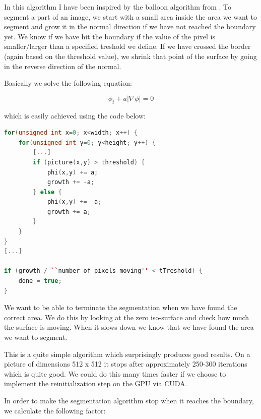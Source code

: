 In this algorithm I have been inspired by the balloon algorithm from
.  To segment a part of an image, we start with a
small area inside the area we want to segment and grow it in the
normal direction if we have not reached the boundary yet. We know if
we have hit the boundary if the value of the pixel is smaller/larger
than a specified treshold we define. If we have crossed the border
(again based on the threshold value), we shrink that point of the
surface by going in the reverse direction of the normal.



Basically we solve the following equation:

\begin{equation}
  \phi_{t} + a|\nabla{\phi}| = 0
\end{equation}

which is easily achieved using the code below: 

\begin{listing}
\begin{lstlisting}[language=c++]
for(unsigned int x=0; x<width; x++) {
    for(unsigned int y=0; y<height; y++) {
        [...]
        if (picture(x,y) > threshold) {
            phi(x,y) += a;
            growth += -a;
        } else {
            phi(x,y) += -a;
            growth += a;
        }
    }
}
[...]

if (growth / ``number of pixels moving'' < tTreshold) {
    done = true;
}
\end{lstlisting}
\label{segmentation:code}
\end{listing}


We want to be able to terminate the segmentation when we have found
the correct area. We do this by looking at the zero iso-surface and
check how much the surface is moving. When it slows down we know that
we have found the area we want to segment.

This is a quite simple algorithm which surprisingly produces good
results. On a picture of dimensions 512 x 512 it stops after
approximately 250-300 iterations which is quite good. We could do this
many times faster if we choose to implement the reinitialization step
on the GPU via CUDA.

In order to make the segmentation algorithm stop when it reaches the
boundary, we calculate the following factor:

